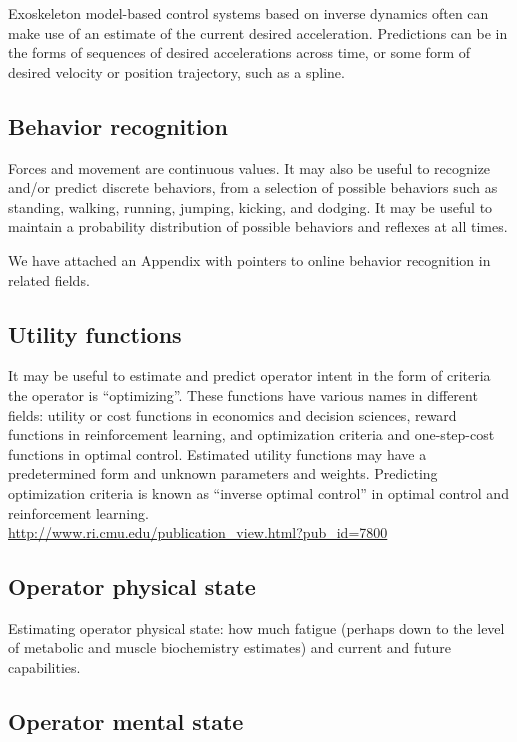 \documentclass[letterpaper,12pt,fullpage]{article}
\begin{document}
Exoskeleton model-based control systems based on inverse dynamics often
can make use of an estimate of the current desired acceleration.
Predictions can be in the forms of sequences of desired accelerations
across time, or some form of desired velocity or position trajectory,
such as a spline.

\subsection{Behavior recognition}

Forces and movement are continuous values. It may also be useful to
recognize and/or predict discrete behaviors, from a selection of
possible behaviors such as 
standing, walking,
running, jumping, kicking, and dodging.
It may be useful to maintain a probability distribution of possible
behaviors and reflexes at all times.

We have attached an Appendix with pointers to online behavior
recognition in related fields.

\subsection{Utility functions}

It may be useful to estimate and predict operator intent in the form
of criteria the operator is ``optimizing''. These functions have
various names in different fields: utility or cost functions in economics
and decision sciences,
reward functions in reinforcement learning, and
optimization criteria and one-step-cost functions in optimal control.
Estimated utility functions may have a predetermined form and unknown
parameters and weights.
Predicting optimization criteria is known as ``inverse optimal control''
in optimal control and reinforcement learning.\\
\url{http://www.ri.cmu.edu/publication_view.html?pub_id=7800}

\subsection{Operator physical state}

Estimating operator physical state: how much fatigue (perhaps down
to the level of metabolic and muscle biochemistry estimates) and
current and future capabilities.

\subsection{Operator mental state}
\end{document}

